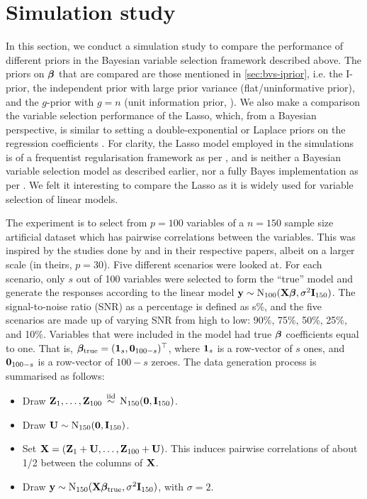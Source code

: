 \documentclass[11pt,twoside,openright]{report}
\begin{document}
\section{Simulation study}

In this section, we conduct a simulation study to compare the performance of different priors in the Bayesian variable selection framework described above.
The priors on ${\bm\beta}$ that are compared are those mentioned in \cref{sec:bvs-iprior}, i.e. the I-prior, the independent prior with large prior variance (flat/uninformative prior), and the $g$-prior with $g=n$ (unit information prior, \cite{Ntzoufras2008}).
We also make a comparison the variable selection performance of the Lasso, which, from a Bayesian perspective, is similar to setting a double-exponential or Laplace priors on the regression coefficients \citep{park2008bayesian}. 
For clarity, the Lasso model employed in the simulations is of a frequentist regularisation framework as per \citet{tibshirani1996regression}, and is neither a Bayesian variable selection model as described earlier, nor a fully Bayes implementation as per \citet{park2008bayesian}.
We felt it interesting to compare the Lasso as it is widely used for variable selection of linear models.

The experiment is to select from $p=100$ variables of a $n=150$ sample size artificial dataset which has pairwise correlations between the variables. This was inspired by the studies done by \citet{George1993} and \citet{Kuo1998} in their respective papers, albeit on a larger scale (in theirs, $p=30$).
Five different scenarios were looked at. 
For each scenario, only $s$ out of 100 variables were selected to form the ``true'' model and generate the responses according to the linear model ${\mathbf y}\sim\operatorname{N}_{100}({\mathbf X}{\bm\beta},\sigma^2 {\mathbf I}_{150})$. 
The signal-to-noise ratio (SNR) as a percentage is defined as s\%, and the five scenarios are made up of varying SNR from high to low: 90\%, 75\%, 50\%, 25\%, and 10\%.
Variables that were included in the model had true ${\bm\beta}$ coefficients equal to one.
That is, ${\bm\beta}_\text{true}=({\mathbf 1}_{s},{\mathbf 0}_{100-s})^\top$, where ${\mathbf 1}_{s}$ is a row-vector of $s$ ones, and ${\mathbf 0}_{100-s}$ is a row-vector of $100-s$ zeroes.
The data generation process is summarised as follows:
\begin{itemize}
	\item Draw ${\mathbf Z}_1, \dots, {\mathbf Z}_{100} \,\overset{\text{iid}}{\sim}\, \operatorname{N}_{150}({\mathbf 0}, {\mathbf I}_{150})$.
	\item Draw ${\mathbf U} \sim \operatorname{N}_{150}({\mathbf 0}, {\mathbf I}_{150})$.
	\item Set ${\mathbf X} = ({\mathbf Z}_1 + {\mathbf U},\dots,{\mathbf Z}_{100}+{\mathbf U})$. This induces pairwise correlations of about 1/2 between the columns of ${\mathbf X}$.\footnotemark~
	\item Draw ${\mathbf y} \sim \operatorname{N}_{150}({\mathbf X} {\bm\beta}_{\text{true}}, \sigma^2\mathbf I_{150})$, with $\sigma=2$.
\end{itemize}
\end{document}
